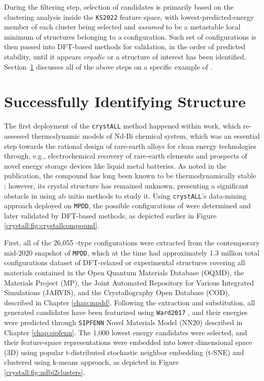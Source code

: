 During the filtering step, selection of candidates is primarily based on the clustering analysis inside the \texttt{KS2022} feature space, with lowest-predicted-energy member of each cluster being selected and \emph{assumed} to be a metastable local minimum of structures belonging to a configuration. Such set of configurations is then passed into DFT-based methods for validation, in the order of predicted stability, until it appears \emph{ergodic} or a structure of interest has been identified. Section~\ref{crystall:ndbi2} discusses all of the above steps on a specific example of .


\section{Successfully Identifying  Structure} \label{crystall:ndbi2}

The first deployment of the \texttt{crystALL} method happened within \citet{Im2022ThermodynamicModeling} work, which re-assessed thermodynamic models of Nd-Bi chemical system, which was an essential step towards the rational design of rare-earth alloys for clean energy technologies through, e.g., electrochemical recovery of rare-earth elements and prospects of novel energy storage devices like liquid metal batteries. As noted in the publication, the  compound has long been known to be thermodynamically stable \cite{Yoshihara1975Rare-earthBismuthides}; however, its crystal structure has remained unknown, presenting a significant obstacle in using ab initio methods to study it. Using \texttt{crystALL}'s data-mining approach deployed on \texttt{MPDD}, the possible configurations of  were determined and later validated by DFT-based methods, as depicted earlier in Figure \ref{crystall:fig:crystallcompound}.

First, all of the 26,055 -type configurations were extracted from the contemporary mid-2020 snapshot of \texttt{MPDD}, which at the time had approximately 1.3 million total configurations dataset of DFT-relaxed or experimental structures covering all materials contained in the Open Quantum Materials Database (OQMD), the Materials Project (MP), the Joint Automated Repository for Various Integrated Simulations (JARVIS), and the Crystallography Open Database (COD), described in Chapter \ref{chap:mpdd}. Following the extraction and substitution, all generated candidates have been featurized using \texttt{Ward2017} \cite{Ward2017IncludingTessellations}, and their energies were predicted through \texttt{SIPFENN} Novel Materials Model (NN20) described in Chapter \ref{chap:sipfenn}. The 1,000 lowest energy candidates were selected, and their feature-space representations were embedded into lower dimensional space (3D) using popular t-distributed stochastic neighbor embedding (t-SNE) \cite{HintonStochasticEmbedding} and clustered using k-means approach, as depicted in Figure \ref{crystall:fig:ndbi2clusters}.

